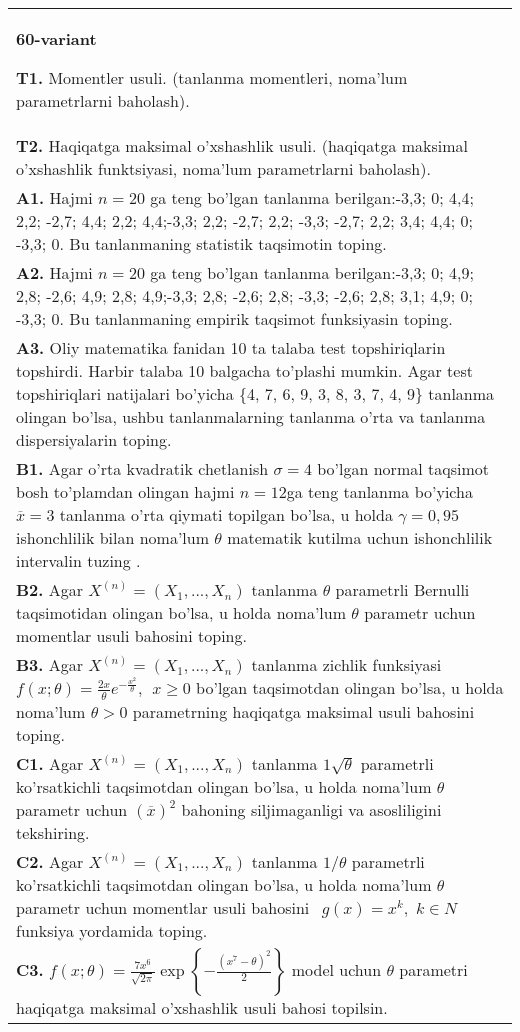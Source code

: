 \documentclass{article}
\begin{document}
\begin{tabular}{m{17cm}}
\textbf{60-variant}
\newline

\textbf{T1.} 
Momentler usuli. (tanlanma momentleri, noma'lum parametrlarni baholash).
\\
\textbf{T2.} 
Haqiqatga maksimal o'xshashlik usuli. (haqiqatga maksimal o'xshashlik funktsiyasi, noma'lum parametrlarni baholash).
\\
\textbf{A1.} 
Hajmi \(n = 20\) ga teng bo'lgan tanlanma berilgan:-3,3; 0; 4,4; 2,2; -2,7; 4,4; 2,2; 4,4;-3,3; 2,2; -2,7; 2,2; -3,3; -2,7; 2,2; 3,4; 4,4; 0; -3,3; 0. Bu tanlanmaning statistik taqsimotin toping.
\\
\textbf{A2.} 
Hajmi \(n = 20\) ga teng bo'lgan tanlanma berilgan:-3,3; 0; 4,9; 2,8; -2,6; 4,9; 2,8; 4,9;-3,3; 2,8; -2,6; 2,8; -3,3; -2,6; 2,8; 3,1; 4,9; 0; -3,3; 0. Bu tanlanmaning empirik taqsimot funksiyasin toping.
\\
\textbf{A3.} 
Oliy matematika fanidan 10 ta talaba test topshiriqlarin topshirdi. Harbir talaba 10 balgacha to'plashi mumkin. Agar test topshiriqlari natijalari bo'yicha \{4, 7, 6, 9, 3, 8, 3, 7, 4, 9\} tanlanma olingan bo'lsa, ushbu tanlanmalarning tanlanma o'rta va tanlanma dispersiyalarin toping.
\\
\textbf{B1.} 
Agar o'rta kvadratik chetlanish \(\sigma = 4\) bo'lgan normal taqsimot bosh to'plamdan olingan hajmi \(n = 12\)ga teng tanlanma bo'yicha \(\overline{x} = 3\) tanlanma o'rta qiymati topilgan bo'lsa, u holda \(\gamma = 0,95\) ishonchlilik bilan noma'lum \(\theta\) matematik kutilma uchun ishonchlilik intervalin tuzing .
\\
\textbf{B2.} 
Agar \(X^{(n)} = \left( X_{1},...,X_{n} \right)\) tanlanma \(\theta\) parametrli Bernulli taqsimotidan olingan bo'lsa, u holda noma'lum \(\theta\) parametr uchun momentlar usuli bahosini toping.
\\
\textbf{B3.} 
Agar \(X^{(n)} = \left( X_{1},...,X_{n} \right)\) tanlanma zichlik funksiyasi \(f(x;\theta) = \frac{2x}{\theta}e^{- \frac{x^{2}}{\theta}},\ \ x \geq 0\) bo'lgan taqsimotdan olingan bo'lsa, u holda noma'lum \(\theta > 0\) parametrning haqiqatga maksimal usuli bahosini toping.
\\
\textbf{C1.} 
Agar \(X^{(n)} = \left( X_{1},...,X_{n} \right)\) tanlanma \(1\sqrt{\theta}\) parametrli ko'rsatkichli taqsimotdan olingan bo'lsa, u holda noma'lum \(\theta\) parametr uchun \((\overline{x})^{2}\) bahoning siljimaganligi va asosliligini tekshiring.
\\
\textbf{C2.} 
Agar \(X^{(n)} = \left( X_{1},...,X_{n} \right)\) tanlanma \(1/\theta\) parametrli ko'rsatkichli taqsimotdan olingan bo'lsa, u holda noma'lum \(\theta\) parametr uchun momentlar usuli bahosini \(\ \ g(x) = x^{k},\) \(k \in N\) funksiya yordamida toping.
\\
\textbf{C3.} 
\(f(x;\theta) = \frac{7x^{6}}{\sqrt{2\pi}}\exp\left\{ - \frac{(x^{7} - \theta)^{2}}{2} \right\}\) model uchun \(\theta\) parametri haqiqatga maksimal o'xshashlik usuli bahosi topilsin.
\\

\end{tabular}
\vspace{1cm}
\end{document}
